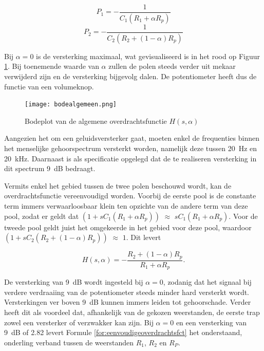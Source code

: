 \documentclass{report}
\begin{document}
\begin{equation}
    P_1 = -\frac{1}{C_1(R_1+ \alpha R_p)}
\end{equation}
\begin{equation}
    P_2 = -\frac{1}{C_2(R_2+(1- \alpha )R_p)}
\end{equation}

Bij $\alpha = 0$ is de versterking maximaal, wat gevisualiseerd is in het rood op Figuur \ref{bodealgemeen}. Bij toenemende waarde van $\alpha$ zullen de polen steeds verder uit mekaar verwijderd zijn en de versterking bijgevolg dalen. De potentiometer heeft dus de functie van een volumeknop.

\begin{figure}[h]
	\centering
	\texttt{[image: bodealgemeen.png]}
	\caption{Bodeplot van de algemene overdrachtsfunctie $H(s,\alpha)$}
	\label{bodealgemeen}
\end{figure}

Aangezien het om een geluidsversterker gaat, moeten enkel de frequenties binnen het menselijke gehoorspectrum versterkt worden, namelijk deze tussen \SI{20}{\hertz} en \SI{20}{\kilo\hertz}. Daarnaast is als specificatie opgelegd dat de te realiseren versterking in dit spectrum \SI{9}{\deci\bel} bedraagt.

Vermits enkel het gebied tussen de twee polen beschouwd wordt, kan de overdrachtsfunctie vereenvoudigd worden. 
Voorbij de  eerste pool is de constante term immers verwaarloosbaar klein ten opzichte van de andere term van deze pool, zodat er geldt dat $(1+sC_1(R_1+\alpha R_p))$ $\approx$ $sC_1(R_1+\alpha R_p)$. Voor de tweede pool geldt juist het omgekeerde in het gebied voor deze pool, waardoor $(1+sC_2(R_2+(1-\alpha)R_p))$ $\approx$ $1$. Dit levert 

\begin{equation}
     H(s,\alpha) = -\frac{R_2+(1-\alpha)R_p}{R_1+\alpha R_p}
    \label{for:eenvoudigeoverdrachtsfct}.
\end{equation}

De versterking van \SI{9}{\deci\bel} wordt ingesteld bij $\alpha = 0$, zodanig dat het signaal bij verdere verdraaiing van de potentiometer steeds minder hard versterkt wordt. Versterkingen ver boven \SI{9}{\deci\bel} kunnen immers leiden tot gehoorschade. Verder heeft dit als voordeel dat, afhankelijk van de gekozen weerstanden, de eerste trap zowel een versterker of verzwakker kan zijn.
Bij $\alpha = 0$ en een versterking van \SI{9}{\deci\bel} of 2.82 levert Formule \ref{for:eenvoudigeoverdrachtsfct} het onderstaand, onderling verband tussen de weerstanden $R_1$, $R_2$ en $R_P$.
\end{document}
